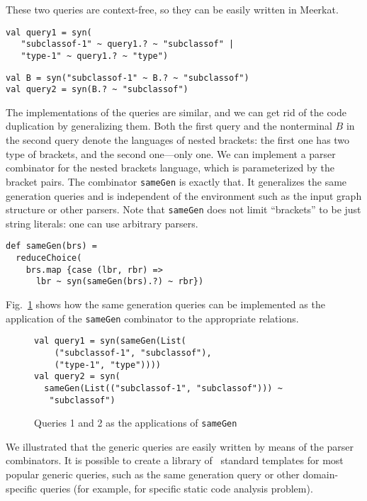 These two queries are context-free, so they can be easily written in Meerkat.


\begin{lstlisting}
val query1 = syn(
   "subclassof-1" ~ query1.? ~ "subclassof" |
   "type-1" ~ query1.? ~ "type")
\end{lstlisting}

\begin{lstlisting}
val B = syn("subclassof-1" ~ B.? ~ "subclassof")
val query2 = syn(B.? ~ "subclassof")
\end{lstlisting}

The implementations of the queries are similar, and we can get rid of the code duplication by generalizing them.
Both the first query and the nonterminal $B$ in the second query denote the languages of nested brackets: the first one has two type of brackets, and the second one---only one.
We can implement a parser combinator for the nested brackets language, which is parameterized by the bracket pairs.
The combinator \lstinline{sameGen} is exactly that.
It generalizes the same generation queries and is independent of the environment such as the input graph structure or other parsers.
Note that \lstinline{sameGen} does not limit ``brackets'' to be just string literals: one can use arbitrary parsers.


\begin{lstlisting}
def sameGen(brs) =
  reduceChoice(
    brs.map {case (lbr, rbr) =>
      lbr ~ syn(sameGen(brs).?) ~ rbr})
\end{lstlisting}

Fig.~\ref{fig:queryGen} shows how the same generation queries can be implemented as the application of the \lstinline{sameGen} combinator to the appropriate relations.

\begin{figure}[!h]
\begin{lstlisting}
val query1 = syn(sameGen(List(
    ("subclassof-1", "subclassof"),
    ("type-1", "type"))))
val query2 = syn(
  sameGen(List(("subclassof-1", "subclassof"))) ~
   "subclassof")
\end{lstlisting}
\caption{Queries 1 and 2 as the applications of \lstinline{sameGen}}
\label{fig:queryGen}
\end{figure}


We illustrated that the generic queries are easily written by means of the parser combinators.
It is possible to create a library of \ standard templates for most popular generic queries, such as the same generation query or other domain-specific queries (for example, for specific static code analysis problem).


